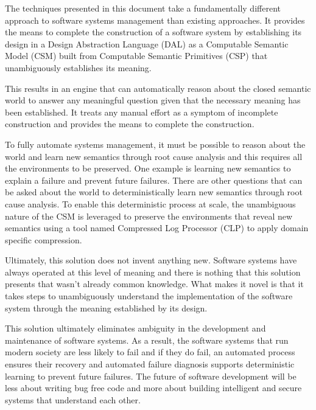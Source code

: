 The techniques presented in this document take a fundamentally different approach to software systems management than existing approaches. It provides the means to complete the construction of a software system by establishing its design in a Design Abstraction Language (DAL) as a Computable Semantic Model (CSM) built from Computable Semantic Primitives (CSP) that unambiguously establishes its meaning.

This results in an engine that can automatically reason about the closed semantic world to answer any meaningful question given that the necessary meaning has been established. It treats any manual effort as a symptom of incomplete construction and provides the means to complete the construction. 

To fully automate systems management, it must be possible to reason about the world and learn new semantics through root cause analysis and this requires all the environments to be preserved. One example is learning new semantics to explain a failure and prevent future failures. There are other questions that can be asked about the world to deterministically learn new semantics through root cause analysis. To enable this deterministic process at scale, the unambiguous nature of the CSM is leveraged to preserve the environments that reveal new semantics using a tool named Compressed Log Processor (CLP) to apply domain specific compression.

Ultimately, this solution does not invent anything new. Software systems have always operated at this level of meaning and there is nothing that this solution presents that wasn't already common knowledge. What makes it novel is that it takes steps to unambiguously understand the implementation of the software system through the meaning established by its design.

This solution ultimately eliminates ambiguity in the development and maintenance of software systems. As a result, the software systems that run modern society are less likely to fail and if they do fail, an automated process ensures their recovery and automated failure diagnosis supports deterministic learning to prevent future failures. The future of software development will be less about writing bug free code and more about building intelligent and secure systems that understand each other.

